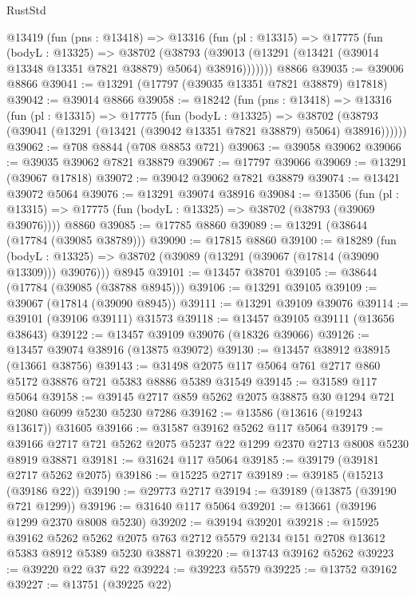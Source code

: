 \begin{lexlean}{RustStd}
\begin{coremodule}
    @13419
      (fun (pns : @13418) =>
      @13316
        (fun (pl : @13315) =>
        @17775
          (fun (bodyL : @13325) =>
          @38702
            (@38793 (@39013 (@13291 (@13421 (@39014 @13348 @13351 @7821 @38879) @5064) @38916)))))))
    @8866
@39035 := @39006 @8866
@39041 := @13291 (@17797 (@39035 @13351 @7821 @38879) @17818)
@39042 := @39014 @8866
@39058 := @18242
    (fun (pns : @13418) =>
    @13316
      (fun (pl : @13315) =>
      @17775
        (fun (bodyL : @13325) =>
        @38702 (@38793 (@39041 (@13291 (@13421 (@39042 @13351 @7821 @38879) @5064) @38916))))))
@39062 := @708 @8844 (@708 @8853 @721)
@39063 := @39058 @39062
@39066 := @39035 @39062 @7821 @38879
@39067 := @17797 @39066
@39069 := @13291 (@39067 @17818)
@39072 := @39042 @39062 @7821 @38879
@39074 := @13421 @39072 @5064
@39076 := @13291 @39074 @38916
@39084 := @13506
    (fun (pl : @13315) => @17775 (fun (bodyL : @13325) => @38702 (@38793 (@39069 @39076))))
    @8860
@39085 := @17785 @8860
@39089 := @13291 (@38644 (@17784 (@39085 @38789)))
@39090 := @17815 @8860
@39100 := @18289
    (fun (bodyL : @13325) => @38702 (@39089 (@13291 (@39067 (@17814 (@39090 @13309))) @39076)))
    @8945
@39101 := @13457 @38701
@39105 := @38644 (@17784 (@39085 (@38788 @8945)))
@39106 := @13291 @39105
@39109 := @39067 (@17814 (@39090 @8945))
@39111 := @13291 @39109 @39076
@39114 := @39101 (@39106 @39111) @31573
@39118 := @13457 @39105 @39111 (@13656 @38643)
@39122 := @13457 @39109 @39076 (@18326 @39066)
@39126 := @13457 @39074 @38916 (@13875 @39072)
@39130 := @13457 @38912 @38915 (@13661 @38756)
@39143 := @31498 @2075 @117 @5064 @761 @2717 @860 @5172 @38876 @721 @5383 @8886 @5389 @31549
@39145 := @31589 @117 @5064
@39158 := @39145 @2717 @859 @5262 @2075 @38875 @30 @1294 @721 @2080 @6099 @5230 @5230 @7286
@39162 := @13586 (@13616 (@19243 @13617)) @31605
@39166 := @31587 @39162 @5262 @117 @5064
@39179 := @39166 @2717 @721 @5262 @2075 @5237 @22 @1299 @2370 @2713 @8008 @5230 @8919 @38871
@39181 := @31624 @117 @5064
@39185 := @39179 (@39181 @2717 @5262 @2075)
@39186 := @15225 @2717
@39189 := @39185 (@15213 (@39186 @22))
@39190 := @29773 @2717
@39194 := @39189 (@13875 (@39190 @721 @1299))
@39196 := @31640 @117 @5064
@39201 := @13661 (@39196 @1299 @2370 @8008 @5230)
@39202 := @39194 @39201
@39218 := @15925
    @39162
    @5262
    @5262
    @2075
    @763
    @2712
    @5579
    @2134
    @151
    @2708
    @13612
    @5383
    @8912
    @5389
    @5230
    @38871
@39220 := @13743 @39162 @5262
@39223 := @39220 @22 @37 @22
@39224 := @39223 @5579
@39225 := @13752 @39162
@39227 := @13751 (@39225 @22)

\end{coremodule}
\end{lexlean}
